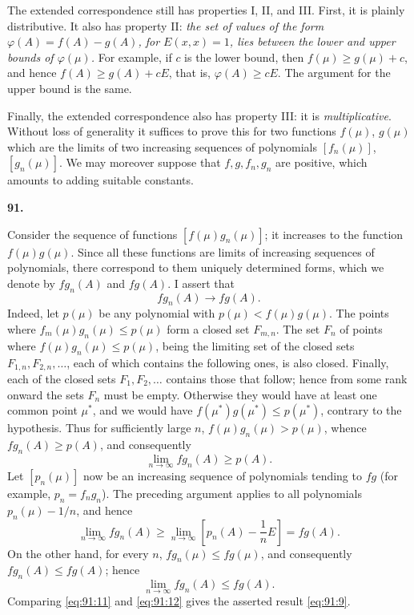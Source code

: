 \documentclass[
  paper=b5,
  fontsize=13pt,
  twoside=true,
  open=any,
  bookmarkpackage=false,
  chapterprefix=true,
  headings=normal
]{scrbook}
\theoremstyle{definition}
\newcommand{\numberedparagraph}[1]{%
  \par\medskip\phantomsection\label{sec:#1}%
  \noindent\textbf{#1.}\enspace
}
\begin{document}
The extended correspondence still has properties I, II, and III.  First, it is
plainly distributive.  It also has property II: \emph{the set of values of the
form \(\varphi(A)=f(A)-g(A)\), for \(E(x,x)=1\), lies between the lower and
upper bounds of \(\varphi(\mu)\).}  For example, if \(c\) is the lower bound,
then \(f(\mu)\ge g(\mu)+c\), and hence \(f(A)\ge g(A)+cE\), that is,
\(\varphi(A)\ge cE\).  The argument for the upper bound is the same.

Finally, the extended correspondence also has property III: it is
\emph{multiplicative}.  Without loss of generality it suffices to prove this for
two functions \(f(\mu)\), \(g(\mu)\) which are the limits of two increasing
sequences of polynomials \([f_n(\mu)]\), \([g_n(\mu)]\).  We may moreover suppose
that \(f,g,f_n,g_n\) are positive, which amounts to adding suitable constants.

\numberedparagraph{91}
Consider the sequence of functions \([f(\mu)g_n(\mu)]\); it increases to the
function \(f(\mu)g(\mu)\).  Since all these functions are limits of increasing
sequences of polynomials, there correspond to them uniquely determined forms,
which we
denote by \(fg_n(A)\) and \(fg(A)\).  I assert that
\begin{equation}
  fg_n(A)\longrightarrow fg(A).
  \tag{9}\label{eq:91:9}
\end{equation}
Indeed, let \(p(\mu)\) be any polynomial with
\(p(\mu)<f(\mu)g(\mu)\).  The points where
\(f_m(\mu)g_n(\mu)\le p(\mu)\) form a closed set \(F_{m,n}\).  The set \(F_n\)
of points where \(f(\mu)g_n(\mu)\le p(\mu)\), being the limiting set of the
closed sets \(F_{1,n},F_{2,n},\ldots\), each of which contains the following
ones, is also closed.  Finally, each of the closed sets
\(F_1,F_2,\ldots\) contains those that follow; hence from some rank onward the
sets \(F_n\) must be empty.  Otherwise they would have at least one common point
\(\mu^*\), and we would have
\(f(\mu^*)g(\mu^*)\le p(\mu^*)\), contrary to the hypothesis.  Thus for
sufficiently large \(n\), \(f(\mu)g_n(\mu)>p(\mu)\), whence
\(fg_n(A)\ge p(A)\), and consequently
\begin{equation}
  \lim_{n\to\infty}fg_n(A)\ge p(A).
  \tag{10}\label{eq:91:10}
\end{equation}
Let \([p_n(\mu)]\) now be an increasing sequence of polynomials tending to
\(fg\) (for example, \(p_n=f_ng_n\)).  The preceding argument applies to all
polynomials \(p_n(\mu)-1/n\), and hence
\begin{equation}
  \lim_{n\to\infty}fg_n(A)
  \ge\lim_{n\to\infty}\left[p_n(A)-\frac1nE\right]=fg(A).
  \tag{11}\label{eq:91:11}
\end{equation}
On the other hand, for every \(n\),
\(fg_n(\mu)\le fg(\mu)\), and consequently
\(fg_n(A)\le fg(A)\); hence
\begin{equation}
  \lim_{n\to\infty}fg_n(A)\le fg(A).
  \tag{12}\label{eq:91:12}
\end{equation}
Comparing \eqref{eq:91:11} and \eqref{eq:91:12} gives the asserted result
\eqref{eq:91:9}.
\end{document}
